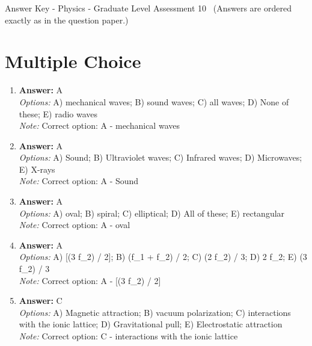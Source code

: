 \documentclass[12pt]{article}
\begin{document}
\begin{center}
Answer Key - Physics - Graduate Level Assessment 10 \
\small (Answers are ordered exactly as in the question paper.)
\end{center}

\section*{Multiple Choice}
\begin{enumerate}[label=\arabic*.]
\item \textbf{Answer:} A
\\ \textit{Options:} A) mechanical waves; B) sound waves; C) all waves; D) None of these; E) radio waves
\\ \textit{Note:} Correct option: A - mechanical waves
\item \textbf{Answer:} A
\\ \textit{Options:} A) Sound; B) Ultraviolet waves; C) Infrared waves; D) Microwaves; E) X-rays
\\ \textit{Note:} Correct option: A - Sound
\item \textbf{Answer:} A
\\ \textit{Options:} A) oval; B) spiral; C) elliptical; D) All of these; E) rectangular
\\ \textit{Note:} Correct option: A - oval
\item \textbf{Answer:} A
\\ \textit{Options:} A) [(3 f\_2) / 2]; B) (f\_1 + f\_2) / 2; C) (2 f\_2) / 3; D) 2 f\_2; E) (3 f\_2) / 3
\\ \textit{Note:} Correct option: A - [(3 f\_2) / 2]
\item \textbf{Answer:} C
\\ \textit{Options:} A) Magnetic attraction; B) vacuum polarization; C) interactions with the ionic lattice; D) Gravitational pull; E) Electrostatic attraction
\\ \textit{Note:} Correct option: C - interactions with the ionic lattice
\end{enumerate}
\end{document}

